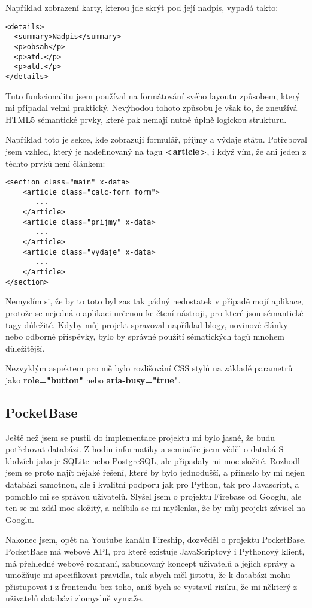 \documentclass[11pt,a4paper,twoside,openright]{report}
\begin{document}
Například zobrazení karty, kterou jde skrýt pod její nadpis, vypadá takto:

\begin{verbatim}
<details>
  <summary>Nadpis</summary>
  <p>obsah</p>
  <p>atd.</p>
  <p>atd.</p>
</details>
\end{verbatim}

Tuto funkcionalitu jsem používal na formátování svého layoutu způsobem, který mi připadal velmi praktický.
Nevýhodou tohoto způsobu je však to, že zneužívá HTML5 sémantické prvky, které pak nemají nutně úplně logickou
strukturu.

Například toto je sekce, kde zobrazuji formulář, příjmy a výdaje státu. Potřeboval jsem vzhled, který
je nadefinovaný na tagu \textbf{<article>}, i když vím, že ani jeden z těchto prvků není článkem:

\begin{verbatim}
<section class="main" x-data>
    <article class="calc-form form">
       ...
    </article>
    <article class="prijmy" x-data>
       ...
    </article>
    <article class="vydaje" x-data>
       ...
    </article>
</section>
\end{verbatim}

Nemyslím si, že by to toto byl zas tak pádný nedostatek v případě mojí aplikace, protože se nejedná o
aplikaci určenou ke čtení nástroji, pro které jsou sémantické tagy důležité. Kdyby můj projekt spravoval
například blogy, novinové články nebo odborné příspěvky, bylo by správné použití sématických tagů
mnohem důležitější.

Nezvyklým aspektem pro mě bylo rozlišování CSS stylů na základě parametrů jako \textbf{role="button"} nebo
\textbf{aria-busy="true"}.

\subsection{PocketBase}
Ještě než jsem se pustil do implementace projektu mi bylo jasné, že budu potřebovat databázi. Z hodin
informatiky a semináře jsem věděl o databá S kbdzích jako je SQLite nebo PostgreSQL, ale připadaly mi moc
složité. Rozhodl jsem se proto najít nějaké řešení, které by bylo jednodušší, a přineslo by mi nejen databázi
samotnou, ale i kvalitní podporu jak pro Python, tak pro Javascript, a pomohlo mi se správou uživatelů.
Slyšel jsem o projektu Firebase od Googlu, ale ten se mi zdál moc složitý, a nelíbila se mi myšlenka,
že by můj projekt závisel na Googlu.

Nakonec jsem, opět na Youtube kanálu Fireship, dozvěděl o projektu PocketBase. PocketBase má webové API,
pro které existuje JavaScriptový i Pythonový klient, má přehledné webové rozhraní, zabudovaný koncept uživatelů
a jejich správy a umožňuje mi specifikovat pravidla, tak abych měl jistotu, že k databázi mohu přistupovat
i z frontendu bez toho, aniž bych se vystavil riziku, že mi některý z uživatelů databázi zlomyslně vymaže.
\end{document}
